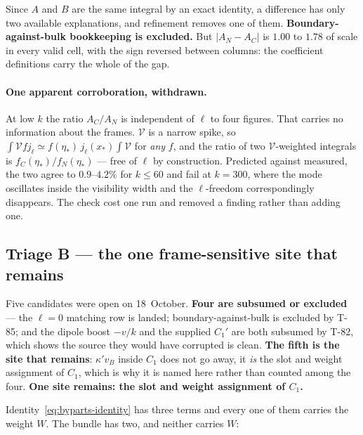 Since $A$ and $B$ are the same integral by an exact identity, a difference has
only two available explanations, and refinement removes one of them.
\textbf{Boundary-against-bulk bookkeeping is excluded.} But
$\lvert A_N - A_C\rvert$ is $1.00$ to $1.78$ of scale in every valid cell, with
the sign reversed between columns: the coefficient definitions carry the whole
of the gap.

\paragraph{One apparent corroboration, withdrawn.}
At low $k$ the ratio $A_C/A_N$ is independent of $\ell$ to four figures. That
carries no information about the frames. $\mathcal V$ is a narrow spike, so
$\int\mathcal V f j_\ell \simeq f(\eta_*)\,j_\ell(x_*)\int\mathcal V$ for
\emph{any} $f$, and the ratio of two $\mathcal V$-weighted integrals is
$f_C(\eta_*)/f_N(\eta_*)$ --- free of $\ell$ by construction. Predicted against
measured, the two agree to $0.9$--$4.2\%$ for $k\le60$ and fail at $k=300$,
where the mode oscillates inside the visibility width and the $\ell$-freedom
correspondingly disappears. The check cost one run and removed a finding rather
than adding one.

\subsection{Triage B --- the one frame-sensitive site that remains}
\label{sec:b-slot}
Five candidates were open on 18~October. \textbf{Four are subsumed or
excluded} --- the $\ell=0$ matching row is landed; boundary-against-bulk is
excluded by T-85; and the dipole boost $-v/k$ and the supplied $C_1'$ are both
subsumed by T-82, which shows the source they would have corrupted is clean.
\textbf{The fifth is the site that remains}: $\kappa'v_B$ inside $C_1$ does not
go away, it \emph{is} the slot and weight assignment of $C_1$, which is why it
is named here rather than counted among the four. \textbf{One site remains:
the slot and weight assignment of $C_1$.}

Identity~\eqref{eq:byparts-identity} has three terms and every one of them
carries the weight $W$. The bundle has two, and neither carries $W$:

